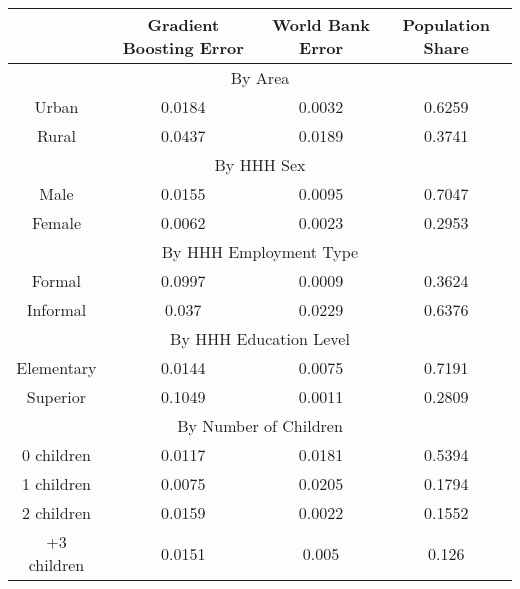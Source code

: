 \begin{table}[]
\begin{tabular}{@{}cccc@{}}
\toprule
            & Gradient Boosting Error & World Bank Error & Population Share \\ \midrule
\multicolumn{4}{c}{By Area}                                                 \\ \midrule
Urban       & 0.0184                  & 0.0032           & 0.6259           \\
Rural       & 0.0437                  & 0.0189           & 0.3741           \\ \midrule
\multicolumn{4}{c}{By HHH Sex}                                              \\ \midrule
Male        & 0.0155                  & 0.0095           & 0.7047           \\
Female      & 0.0062                  & 0.0023           & 0.2953           \\ \midrule
\multicolumn{4}{c}{By HHH Employment Type}                                  \\ \midrule
Formal      & 0.0997                  & 0.0009           & 0.3624           \\
Informal    & 0.037                   & 0.0229           & 0.6376           \\ \midrule
\multicolumn{4}{c}{By HHH Education Level}                                  \\ \midrule
Elementary  & 0.0144                  & 0.0075           & 0.7191           \\
Superior    & 0.1049                  & 0.0011           & 0.2809           \\ \midrule
\multicolumn{4}{c}{By Number of Children}                                   \\ \midrule
0 children  & 0.0117                  & 0.0181           & 0.5394           \\
1 children  & 0.0075                  & 0.0205           & 0.1794           \\
2 children  & 0.0159                  & 0.0022           & 0.1552           \\
+3 children & 0.0151                  & 0.005            & 0.126           
\end{tabular}
\end{table}